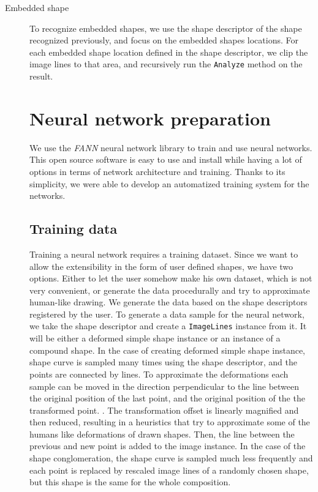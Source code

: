 \begin{description}
\begin{description}
\item [Embedded shape]
To recognize embedded shapes, we use the shape descriptor of the shape recognized previously, and focus on the embedded shapes locations. For each embedded shape location defined in the shape descriptor, we clip the image lines to that area, and recursively run the \texttt{Analyze} method on the result.

\section{Neural network preparation}
We use the \emph{FANN} neural network library to train and use neural networks. This open source software is easy to use and install while having a lot of options in terms of network architecture and training. Thanks to its simplicity, we were able to develop an automatized training system for the networks.

\subsection{Training data}
Training a neural network requires a training dataset. Since we want to allow the extensibility in the form of user defined shapes, we have two options. Either to let the user somehow make his own dataset, which is not very convenient, or generate the data procedurally and try to approximate human-like drawing. We generate the data based on the shape descriptors registered by the user. To generate a data sample for the neural network, we take the shape descriptor and create a \texttt{ImageLines} instance from it. It will be either a deformed simple shape instance or an instance of a compound shape. In the case of creating deformed simple shape instance, shape curve is sampled many times using the shape descriptor, and the points are connected by lines. 
To approximate the deformations each sample can be moved in the direction perpendicular to the line between the original position of the last point, and the original position of the the transformed point. . The transformation  offset is linearly magnified and then reduced, resulting in a heuristics that try to approximate some of the humans like deformations of drawn shapes. Then, the line between the previous and new point is added to the image instance. In the case of the shape conglomeration, the shape curve is sampled much less frequently and each point is replaced by rescaled image lines of a randomly chosen shape, but this shape is the same for the whole composition.


\end{description}
\end{description}
